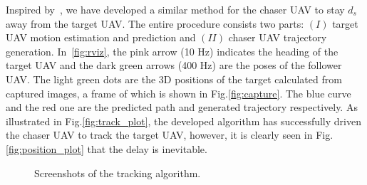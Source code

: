 Inspired by~\cite{Chenjing}, we have developed a similar method for the chaser UAV to stay $d_s$ away from the target UAV. The entire procedure consists two parts: $(\mathit{I})$ target UAV motion estimation and prediction and $(\mathit{II})$ chaser UAV trajectory generation. In~\ref{fig:rviz}, the pink arrow (10 Hz) indicates the heading of the target UAV and the dark green arrows (400 Hz) are the poses of the follower UAV. The light green dots are the 3D positions of the target calculated from captured images, a frame of which is shown in Fig.\ref{fig:capture}. The blue curve and the red one are the predicted path and generated trajectory respectively. As illustrated in Fig.\ref{fig:track_plot}, the developed algorithm has successfully driven the chaser UAV to track the target UAV, however, it is clearly seen in Fig.\ref{fig:position_plot} that the delay is inevitable.

\begin{figure}[H]
  \centering
  \caption{Screenshots of the tracking algorithm.}\label{fig:rviz_capture}
\end{figure}

